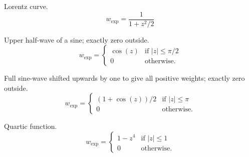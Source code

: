\begin{codelist}
\begin{table}[htbp]
\begin{codelist}
    \item[\itempar{lorentz \\ lorentzian}]\itemend
      Lorentz curve.
      \begin{equation}\label{equ:weight:lorentz}
      w_{\mathrm{exp}} = \frac{1}{1 + z^2 / 2}
      \end{equation}

    \item[\itempar{halfsine \\ half-sine}]\itemend
      Upper half-wave of a sine; exactly zero outside.
      \begin{equation}\label{equ:weight:halfsine}
      w_{\mathrm{exp}} =
      \left\{\begin{array}{cl}
      \cos(z) & \mbox{if } |z| \leq \pi/2 \\
      0       & \mbox{otherwise.}
      \end{array}\right.
      \end{equation}

    \item[\itempar{fullsine \\ full-sine}]\itemend
      Full sine-wave shifted upwards by one to give all positive weights; exactly zero outside.
      \begin{equation}\label{equ:weight:fullsine}
      w_{\mathrm{exp}} =
      \left\{\begin{array}{cl}
      (1 + \cos(z)) / 2 & \mbox{if } |z| \leq \pi \\
      0                 & \mbox{otherwise.}
      \end{array} \right.
      \end{equation}

    \item[\itempar{bisquare \\ bi-square}]\itemend
      Quartic function.
      \begin{equation}\label{equ:weight:bisquare}
      w_{\mathrm{exp}} =
      \left\{
      \begin{array}{cl}
        1 - z^4 & \mbox{if } |z| \leq 1 \\
        0       & \mbox{otherwise.}
      \end{array}
      \right.
      \end{equation}
    \end{codelist}


\end{table}
\end{codelist}
